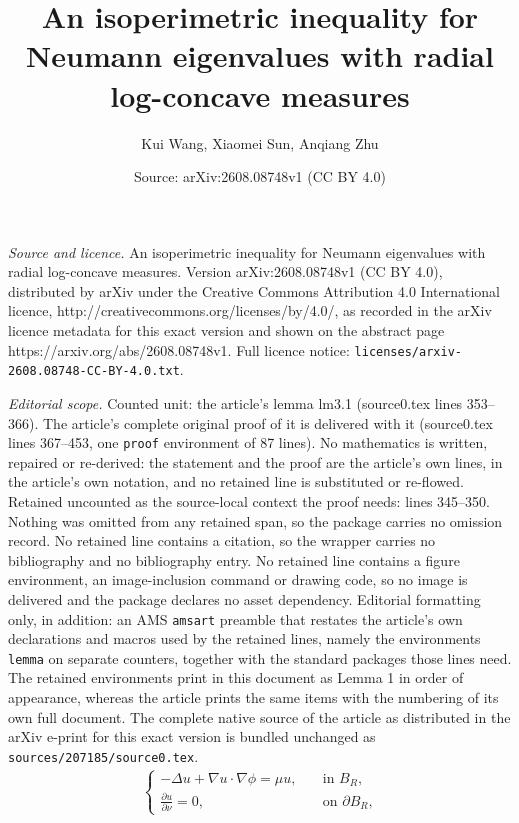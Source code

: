 \documentclass[10pt,a4paper]{amsart}
\title{An isoperimetric inequality for Neumann eigenvalues with radial log-concave measures}
\author{Kui Wang, Xiaomei Sun, Anqiang Zhu}
\date{Source: arXiv:2608.08748v1 (CC BY 4.0)}
\def\p{\partial}
\begin{document}
\maketitle

\noindent\emph{Source and licence.} An isoperimetric inequality for Neumann eigenvalues with radial log-concave measures. Version arXiv:2608.08748v1 (CC BY 4.0), distributed by arXiv under the Creative Commons Attribution 4.0 International licence, http://creativecommons.org/licenses/by/4.0/, as recorded in the arXiv licence metadata for this exact version and shown on the abstract page https://arxiv.org/abs/2608.08748v1. Full licence notice: \texttt{licenses/arxiv-2608.08748-CC-BY-4.0.txt}.\par\smallskip

\noindent\textit{Editorial scope.} Counted unit: the article's lemma lm3.1 (source0.tex lines 353--366). The article's complete original proof of it is delivered with it (source0.tex lines 367--453, one \texttt{proof} environment of 87 lines). No mathematics is written, repaired or re-derived: the statement and the proof are the article's own lines, in the article's own notation, and no retained line is substituted or re-flowed.  Retained uncounted as the source-local context the proof needs: lines 345--350.  Nothing was omitted from any retained span, so the package carries no omission record.  No retained line contains a citation, so the wrapper carries no bibliography and no bibliography entry.  No retained line contains a figure environment, an image-inclusion command or drawing code, so no image is delivered and the package declares no asset dependency.  Editorial formatting only, in addition: an AMS \texttt{amsart} preamble that restates the article's own declarations and macros used by the retained lines, namely the environments \texttt{lemma} on separate counters, together with the standard packages those lines need.  The retained environments print in this document as Lemma 1 in order of appearance, whereas the article prints the same items with the numbering of its own full document.  The complete native source of the article as distributed in the arXiv e-print for this exact version is bundled unchanged as \texttt{sources/207185/source0.tex}.
\begin{align}\label{3.1}
   \begin{cases}
       -\Delta u+\nabla u \cdot \nabla \phi=\mu u, \quad& \text{in $B_R$,}\\
       \frac{\p u}{\p \nu}=0, \quad& \text{on $\p B_R$,}
   \end{cases} 
\end{align}
\end{document}
